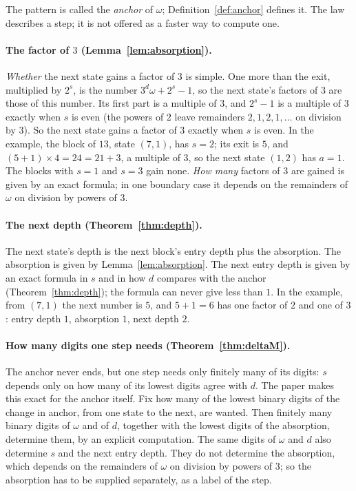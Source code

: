\documentclass[11pt]{article}
\theoremstyle{remark}
\newcommand{\w}{\omega}
\begin{document}
The pattern is called the \emph{anchor} of $\w$; Definition~\ref{def:anchor} defines it. The law describes a step; it is not offered as a faster way to compute one.

\paragraph{The factor of $3$ (Lemma~\ref{lem:absorption}).} \emph{Whether} the next state gains a factor of $3$ is simple. One more than the exit, multiplied by $2^s$, is the number $3^d\w + 2^s - 1$, so the next state's factors of $3$ are those of this number. Its first part is a multiple of $3$, and $2^s - 1$ is a multiple of $3$ exactly when $s$ is even (the powers of $2$ leave remainders $2, 1, 2, 1, \dots$ on division by $3$). So the next state gains a factor of $3$ exactly when $s$ is even. In the example, the block of $13$, state $(7,1)$, has $s = 2$; its exit is $5$, and $(5 + 1) \times 4 = 24 = 21 + 3$, a multiple of $3$, so the next state $(1,2)$ has $a = 1$. The blocks with $s = 1$ and $s = 3$ gain none. \emph{How many} factors of $3$ are gained is given by an exact formula; in one boundary case it depends on the remainders of $\w$ on division by powers of $3$.

\paragraph{The next depth (Theorem~\ref{thm:depth}).} The next state's depth is the next block's entry depth plus the absorption. The absorption is given by Lemma~\ref{lem:absorption}. The next entry depth is given by an exact formula in $s$ and in how $d$ compares with the anchor (Theorem~\ref{thm:depth}); the formula can never give less than $1$. In the example, from $(7,1)$ the next number is $5$, and $5 + 1 = 6$ has one factor of $2$ and one of $3$: entry depth $1$, absorption $1$, next depth $2$.

\paragraph{How many digits one step needs (Theorem~\ref{thm:deltaM}).} The anchor never ends, but one step needs only finitely many of its digits: $s$ depends only on how many of its lowest digits agree with $d$. The paper makes this exact for the anchor itself. Fix how many of the lowest binary digits of the change in anchor, from one state to the next, are wanted. Then finitely many binary digits of $\w$ and of $d$, together with the lowest digits of the absorption, determine them, by an explicit computation. The same digits of $\w$ and $d$ also determine $s$ and the next entry depth. They do not determine the absorption, which depends on the remainders of $\w$ on division by powers of $3$; so the absorption has to be supplied separately, as a label of the step.
\end{document}
